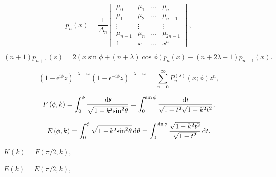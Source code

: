 
\[p_{n}(x)={\frac{1}{\Delta_{n}}}\begin{vmatrix}\mu_{0}&\mu_{1}&\ldots&\mu_{n}\\
\mu_{1}&\mu_{2}&\ldots&\mu_{n+1}\\
\vdots&\vdots&&\vdots\\
\mu_{n-1}&\mu_{n}&\ldots&\mu_{2n-1}\\
1&x&\ldots&x^{n}\end{vmatrix},\]

\[(n+1)p_{n+1}(x)=2\left(x\sin\phi+(n+\lambda)\cos\phi\right)p_{n}(x)-(n+2%
\lambda-1)p_{n-1}(x).\]

\[(1-{\mathrm{e}}^{\mathrm{i}\phi}z)^{-\lambda+\mathrm{i}x}(1-{\mathrm{e}}^{-%
\mathrm{i}\phi}z)^{-\lambda-\mathrm{i}x}=\sum_{n=0}^{\infty}P^{(\lambda)}_{n}%
\left(x;\phi\right)z^{n},\]

\[F\left(\phi,k\right)=\int_{0}^{\phi}\frac{\,\mathrm{d}\theta}{\sqrt{1-k^{2}{%
\sin}^{2}\theta}}=\int_{0}^{\sin\phi}\frac{\,\mathrm{d}t}{\sqrt{1-t^{2}}\sqrt{%
1-k^{2}t^{2}}},\]

\[E\left(\phi,k\right)=\int_{0}^{\phi}\sqrt{1-k^{2}{\sin}^{2}\theta}\,\mathrm{d}%
\theta\\
=\int_{0}^{\sin\phi}\frac{\sqrt{1-k^{2}t^{2}}}{\sqrt{1-t^{2}}}\,\mathrm{d}t.\]

$K\left(k\right)=F\left(\pi/2,k\right),$

$E\left(k\right)=E\left(\pi/2,k\right),$
